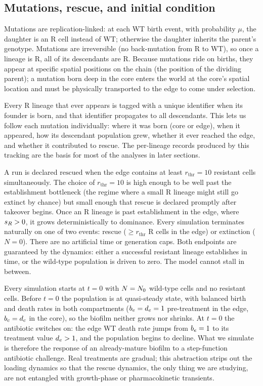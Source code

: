 \subsection{Mutations, rescue, and initial condition}
\label{ssec:mutations}

Mutations are replication-linked: at each WT birth event, with probability $\mu$, the daughter is an R cell instead of WT; otherwise the daughter inherits the parent's genotype. Mutations are irreversible (no back-mutation from R to WT), so once a lineage is R, all of its descendants are R. Because mutations ride on births, they appear at specific spatial positions on the chain (the position of the dividing parent); a mutation born deep in the core enters the world at the core's spatial location and must be physically transported to the edge to come under selection.

Every R lineage that ever appears is tagged with a unique identifier when its founder is born, and that identifier propagates to all descendants. This lets us follow each mutation individually: where it was born (core or edge), when it appeared, how its descendant population grew, whether it ever reached the edge, and whether it contributed to rescue. The per-lineage records produced by this tracking are the basis for most of the analyses in later sections.

A run is declared $\mathrm{rescued}$ when the edge contains at least $r_{\mathrm{thr}} = 10$ resistant cells simultaneously. The choice of $r_{\mathrm{thr}} = 10$ is high enough to be well past the establishment bottleneck (the regime where a small R lineage might still go extinct by chance) but small enough that rescue is declared promptly after takeover begins. Once an R lineage is past establishment in the edge, where $s_R > 0$, it grows deterministically to dominance. Every simulation terminates naturally on one of two events: rescue ($\ge r_{\mathrm{thr}}$ R cells in the edge) or extinction ($N = 0$). There are no artificial time or generation caps. Both endpoints are guaranteed by the dynamics: either a successful resistant lineage establishes in time, or the wild-type population is driven to zero. The model cannot stall in between.

Every simulation starts at $t = 0$ with $N = N_0$ wild-type cells and no resistant cells. Before $t = 0$ the population is at quasi-steady state, with balanced birth and death rates in both compartments ($b_e = d_e = 1$ pre-treatment in the edge, $b_c = d_c$ in the core), so the biofilm neither grows nor shrinks. At $t = 0$ the antibiotic switches on: the edge WT death rate jumps from $b_e = 1$ to its treatment value $d_e > 1$, and the population begins to decline. What we simulate is therefore the response of an already-mature biofilm to a step-function antibiotic challenge. Real treatments are gradual; this abstraction strips out the loading dynamics so that the rescue dynamics, the only thing we are studying, are not entangled with growth-phase or pharmacokinetic transients.

